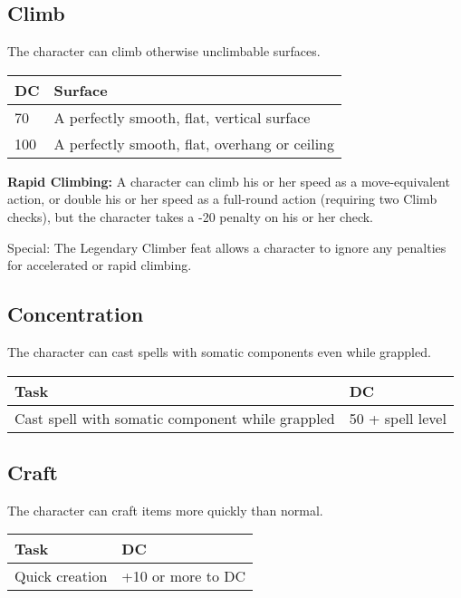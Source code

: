 \documentclass{article}
\begin{document}
\vspace{12pt}
\subsection*{Climb }

The character can climb otherwise unclimbable surfaces. 

\begin{tabular}{|>{\raggedright}p{13pt}|>{\raggedright}p{177pt}|}
\hline
D\textbf{C} & S\textbf{urface }\tabularnewline
\hline
70 & A perfectly smooth, flat, vertical surface \tabularnewline
\hline
100 & A perfectly smooth, flat, overhang or ceiling \tabularnewline
\hline
\end{tabular}

\textbf{Rapid Climbing:}\textit{ }A character can climb his or her speed as a move-equivalent 
action, or double his or her speed as a full-round action (requiring two Climb 
checks), but the character takes a -20 penalty on his or her check. 

Special: The Legendary Climber feat allows a character to ignore any penalties 
for accelerated or rapid climbing. 

\vspace{12pt}
\subsection*{Concentration }

The character can cast spells with somatic components even while grappled. 

\begin{tabular}{|>{\raggedright}p{206pt}|>{\raggedright}p{78pt}|}
\hline
T\textbf{ask} & D\textbf{C }\tabularnewline
\hline
Cast spell with somatic component while grappled & 50 + spell level \tabularnewline
\hline
\end{tabular}

\vspace{12pt}
\subsection*{Craft }

The character can craft items more quickly than normal. 

\begin{tabular}{|>{\raggedright}p{57pt}|>{\raggedright}p{75pt}|}
\hline
T\textbf{ask} & D\textbf{C }\tabularnewline
\hline
Quick creation & +10 or more to DC \tabularnewline
\hline
\end{tabular}
\end{document}
